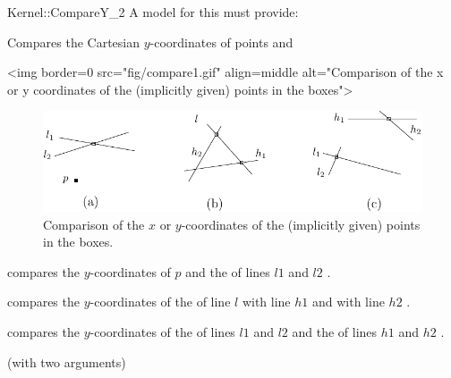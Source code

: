 \begin{ccRefFunctionObjectConcept}{Kernel::CompareY_2}
A model for this must provide:


      {Compares the Cartesian $y$-coordinates of points  and
      }

\begin{ccHtmlOnly}
<img border=0 src="fig/compare1.gif" align=middle alt="Comparison of the x 
or y coordinates of the (implicitly given) points in the boxes">
\end{ccHtmlOnly} 

\begin{ccTexOnly}
\begin{figure}[h]
\centerline{\includegraphics{Kernel_23_ref/fig/compare1}}
\caption{Comparison of the $x$ or $y$-coordinates of the (implicitly
given) points in the boxes.\label{fig-compare14}}
\end{figure} 
\end{ccTexOnly} 


        {compares the $y$-coordinates of $p$ and the 
          of lines
         $l1$ and $l2$%
         .}


        {compares the $y$-coordinates of the  of line $l$
         with line $h1$ and with line $h2$%
         .}


        {compares the $y$-coordinates of the  of lines $l1$
         and $l2$ and  the  of lines $h1$ and $h2$ 
         .}


\ccRefines
{} (with two arguments)

\ccSeeAlso
{} \\

\end{ccRefFunctionObjectConcept}
